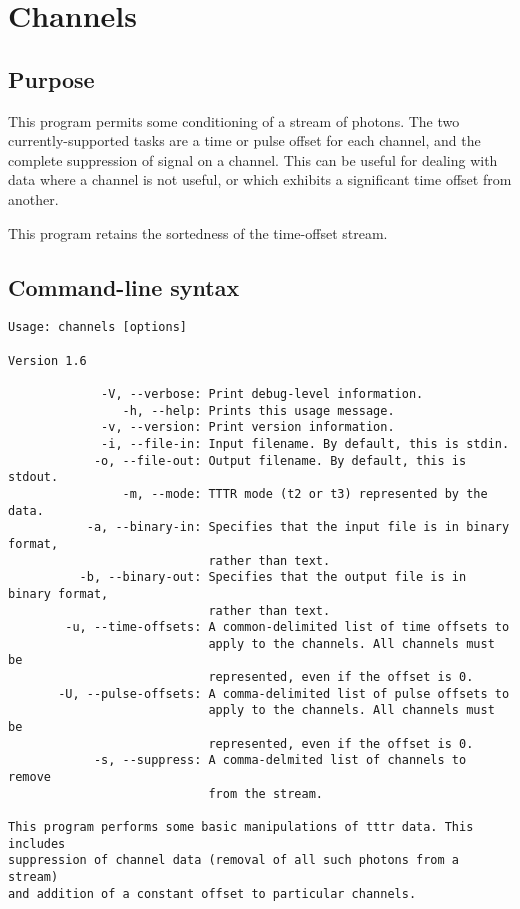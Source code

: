 \section{Channels}
\subsection{Purpose}
This program permits some conditioning of a stream of photons. The two currently-supported tasks are a time or pulse offset for each channel, and the complete suppression of signal on a channel. This can be useful for dealing with data where a channel is not useful, or which exhibits a significant time offset from another.

This program retains the sortedness of the time-offset stream.

\subsection{Command-line syntax}
\begin{verbatim}
Usage: channels [options]

Version 1.6

             -V, --verbose: Print debug-level information.
                -h, --help: Prints this usage message.
             -v, --version: Print version information.
             -i, --file-in: Input filename. By default, this is stdin.
            -o, --file-out: Output filename. By default, this is stdout.
                -m, --mode: TTTR mode (t2 or t3) represented by the data.
           -a, --binary-in: Specifies that the input file is in binary format,
                            rather than text.
          -b, --binary-out: Specifies that the output file is in binary format,
                            rather than text.
        -u, --time-offsets: A common-delimited list of time offsets to
                            apply to the channels. All channels must be
                            represented, even if the offset is 0.
       -U, --pulse-offsets: A comma-delimited list of pulse offsets to 
                            apply to the channels. All channels must be
                            represented, even if the offset is 0.
            -s, --suppress: A comma-delmited list of channels to remove
                            from the stream.

This program performs some basic manipulations of tttr data. This includes
suppression of channel data (removal of all such photons from a stream)
and addition of a constant offset to particular channels.
\end{verbatim}

